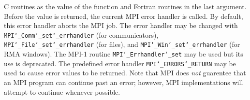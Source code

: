 C routines as the value of the function and Fortran routines in the last
argument.  Before the value is returned, the current MPI error handler is
called.  By default, this error handler aborts the MPI job.  The error handler
may be changed with {\tt MPI{\tt \char`\_}Comm{\tt \char`\_}set{\tt \char`\_}errhandler} (for communicators),
{\tt MPI{\tt \char`\_}File{\tt \char`\_}set{\tt \char`\_}errhandler} (for files), and {\tt MPI{\tt \char`\_}Win{\tt \char`\_}set{\tt \char`\_}errhandler} (for
RMA windows).  The MPI-1 routine {\tt MPI{\tt \char`\_}Errhandler{\tt \char`\_}set} may be used but
its use is deprecated.  The predefined error handler
{\tt MPI{\tt \char`\_}ERRORS{\tt \char`\_}RETURN} may be used to cause error values to be returned.
Note that MPI does {\em not} guarentee that an MPI program can continue past
an error; however, MPI implementations will attempt to continue whenever
possible.
\par
{}
\par
{}
\endmanpage
